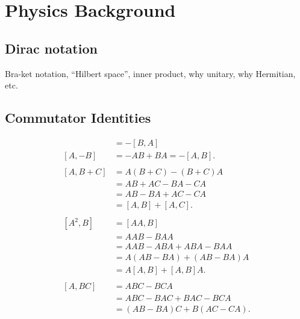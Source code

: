 \chapter{Physics Background}\label{ch:physics_background}

\section{Dirac notation}\label{sec:basics}
Bra-ket notation, ``Hilbert space'', inner product, why unitary, why Hermitian, etc.

\section{Commutator Identities}
\begin{align}
    [A,B] &= -[B,A] \label{eq:BA} \\
    [A,-B] &= -AB + BA = -[A,B].\label{eq:AmB} \\
    \nonumber\\
    [A,B+C] 
        &= A(B+C) - (B+C)A \nonumber\\
        &= AB + AC - BA - CA \nonumber\\
        &= AB - BA + AC - CA \nonumber\\
        &= [A,B] + [A,C]. \label{eq:ABpC} \\
    \nonumber\\
    [A^2,B] 
        &= [AA,B] \nonumber\\
        &= AAB - BAA \nonumber\\
        &= AAB - ABA + ABA - BAA \nonumber\\
        &= A(AB-BA) + (AB-BA)A \nonumber\\
        &= A[A,B] + [A,B]A.\label{eq:A2B}\\
    \nonumber\\
    [A,BC]
        &= ABC - BCA \nonumber\\
        &= ABC - BAC + BAC - BCA \nonumber\\
        &= (AB - BA)C + B(AC - CA).\label{eq:ABC}
\end{align}

